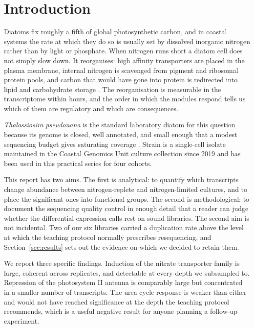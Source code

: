 \section{Introduction}
\label{sec:introduction}

Diatoms fix roughly a fifth of global photosynthetic carbon, and in coastal
systems the rate at which they do so is usually set by dissolved inorganic
nitrogen rather than by light or phosphate. When nitrogen runs short a diatom
cell does not simply slow down. It reorganises: high affinity transporters are
placed in the plasma membrane, internal nitrogen is scavenged from pigment and
ribosomal protein pools, and carbon that would have gone into protein is
redirected into lipid and carbohydrate storage \citep{hockin2012response}.
The reorganisation is measurable in the transcriptome within hours, and the
order in which the modules respond tells us which of them are regulatory and
which are consequences.

\emph{Thalassiosira pseudonana} is the standard laboratory diatom for this
question because its genome is closed, well annotated, and small enough that a
modest sequencing budget gives saturating coverage \citep{armbrust2004genome}.
Strain \strain{} is a single-cell isolate maintained in the Coastal Genomics
Unit culture collection since 2019 and has been used in this practical series
for four cohorts.

This report has two aims. The first is analytical: to quantify which
transcripts change abundance between nitrogen-replete and nitrogen-limited
cultures, and to place the significant ones into functional groups. The second
is methodological: to document the sequencing quality control in enough detail
that a reader can judge whether the differential expression calls rest on sound
libraries. The second aim is not incidental. Two of our six libraries carried a
duplication rate above the level at which the teaching protocol normally
prescribes resequencing, and Section~\ref{sec:results} sets out the evidence on
which we decided to retain them.

We report three specific findings. Induction of the nitrate transporter family
is large, coherent across replicates, and detectable at every depth we
subsampled to. Repression of the photosystem II antenna is comparably large but
concentrated in a smaller number of transcripts. The urea cycle response is
weaker than either and would not have reached significance at the depth the
teaching protocol recommends, which is a useful negative result for anyone
planning a follow-up experiment.
